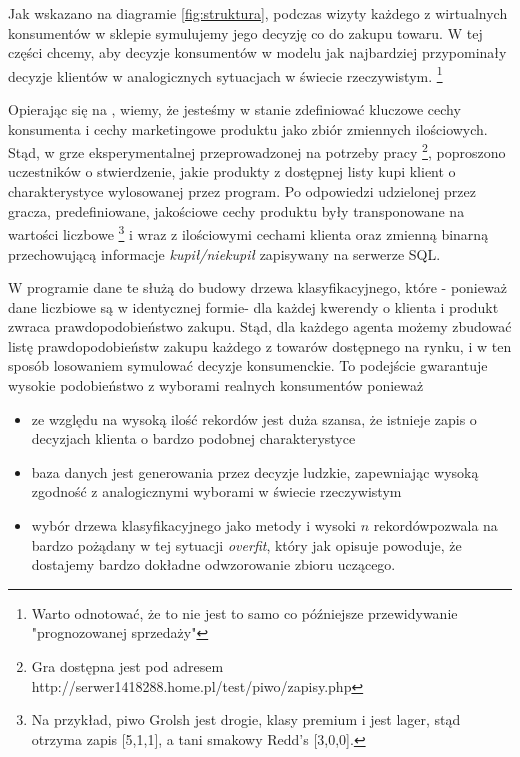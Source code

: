 \documentclass[polish, twoside, 12pt, a4paper]{article}
\theoremstyle{definition}
\theoremstyle{plain}
\theoremstyle{remark}
\begin{document}
Jak wskazano na diagramie \ref{fig:struktura}, podczas wizyty każdego z wirtualnych konsumentów w sklepie symulujemy jego decyzję co do zakupu towaru. W tej części chcemy, aby decyzje konsumentów w modelu jak najbardziej przypominały decyzje klientów w analogicznych sytuacjach w świecie rzeczywistym. \footnote{Warto odnotować, że to nie jest to samo co późniejsze przewidywanie "prognozowanej sprzedaży"} 

Opierając się na \cite{Sagan2011}, wiemy, że jesteśmy w stanie zdefiniować kluczowe cechy konsumenta i cechy marketingowe produktu jako zbiór zmiennych ilościowych. Stąd, w grze eksperymentalnej przeprowadzonej na potrzeby pracy \footnote{Gra dostępna jest pod adresem http://serwer1418288.home.pl/test/piwo/zapisy.php}, poproszono uczestników o stwierdzenie, jakie produkty z dostępnej listy kupi klient o charakterystyce wylosowanej przez program. Po odpowiedzi udzielonej przez gracza, predefiniowane, jakościowe cechy produktu były transponowane na wartości liczbowe \footnote{Na przykład, piwo Grolsh jest drogie, klasy premium i jest lager, stąd otrzyma zapis [5,1,1], a tani smakowy Redd's [3,0,0].} i wraz z ilościowymi cechami klienta oraz zmienną binarną przechowującą informacje \textit{kupił/niekupił} zapisywany na serwerze SQL. 

W programie dane te służą do budowy drzewa klasyfikacyjnego, które - ponieważ dane liczbiowe są w identycznej formie- dla każdej kwerendy o klienta i produkt zwraca prawdopodobieństwo zakupu. Stąd, dla każdego agenta możemy zbudować listę prawdopodobieństw zakupu każdego z towarów dostępnego na rynku, i w ten sposób losowaniem symulować decyzje konsumenckie. To podejście gwarantuje wysokie podobieństwo z wyborami realnych konsumentów ponieważ

	\begin{itemize}
		\item ze względu na wysoką ilość rekordów jest duża szansa, że istnieje zapis o decyzjach klienta o bardzo podobnej charakterystyce
		\item baza danych jest generowania przez decyzje ludzkie, zapewniając wysoką zgodność z analogicznymi wyborami w świecie rzeczywistym
		\item wybór drzewa klasyfikacyjnego  jako metody i wysoki $n$ rekordówpozwala na bardzo pożądany w tej sytuacji \textit{overfit}, który jak opisuje \cite{James2013} powoduje, że dostajemy bardzo dokładne odwzorowanie zbioru uczącego. 
	\end{itemize}
\end{document}
